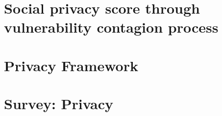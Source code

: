 \chapter[10]{Social privacy score through vulnerability contagion process}
\chapter[11]{Privacy Framework}
\chapter[12]{Survey: Privacy}
	
\frameBibliography




